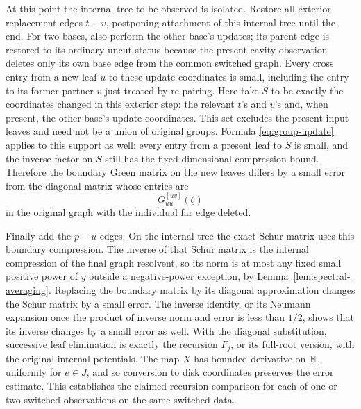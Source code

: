 At this point the internal tree to be observed is isolated.  Restore
all exterior replacement edges $t-v$, postponing attachment of this
internal tree until the end.  For two bases, also perform the other
base's updates; its parent edge is restored to its ordinary uncut
status because the present cavity observation deletes only its own
base edge from the common switched graph.  Every cross entry from a new
leaf $u$ to these update coordinates is small, including the entry
to its former partner $v$ just treated by re-pairing.  Here take $S$ to be exactly the coordinates changed in this exterior
step: the relevant $t$'s and $v$'s and, when present, the other base's
update coordinates.  This set excludes the present input leaves and
need not be a union of original groups.  Formula
\eqref{eq:group-update} applies to this support as well: every entry
from a present leaf to $S$ is small, and the inverse factor on $S$
still has the fixed-dimensional compression bound.  Therefore the
boundary Green matrix on the new leaves differs by a small error from
the diagonal matrix whose entries are
\[
             G^{[uv]}_{uu}(\zeta)
\]
in the original graph with the individual far edge deleted.

Finally add the $p-u$ edges.  On the internal tree the exact Schur
matrix uses this boundary compression.  The inverse of that Schur
matrix is the internal compression of the final graph resolvent,
so its norm is at most any fixed small positive power of $y$ outside
a negative-power exception, by Lemma~\ref{lem:spectral-averaging}.
Replacing the boundary matrix by its diagonal approximation changes
the Schur matrix by a small error.  The inverse identity, or its
Neumann expansion once the product of inverse norm and error is less
than $1/2$, shows that its inverse changes by a small error as well.
With the diagonal substitution, successive leaf elimination is exactly
the recursion $F_j$, or its full-root version, with the original internal
potentials.  The map $X$ has bounded derivative on $\mathbb H$, uniformly
for $e\in J$, and so conversion to disk coordinates preserves the
error estimate.  This establishes the claimed recursion comparison
for each of one or two switched observations on the same switched data.

